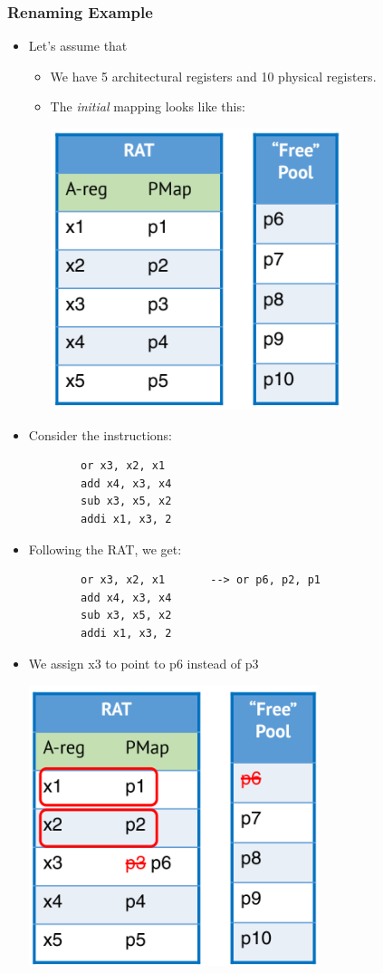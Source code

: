 \documentclass[10pt]{article}
\begin{document}
\subsubsection*{Renaming Example}
\begin{itemize}
    \item Let's assume that
    \begin{itemize}
        \item We have 5 architectural registers and 10 physical registers.
        \item The \textit{initial} mapping looks like this:
        \begin{center}
            \includegraphics[scale=0.9]{W5_3.png}
        \end{center}
    \end{itemize}
    \item Consider the instructions:
    \begin{verbatim}
        or x3, x2, x1
        add x4, x3, x4
        sub x3, x5, x2
        addi x1, x3, 2
    \end{verbatim}
    \item Following the RAT, we get:
    \begin{verbatim}
        or x3, x2, x1       --> or p6, p2, p1
        add x4, x3, x4
        sub x3, x5, x2
        addi x1, x3, 2
    \end{verbatim}
    \item We assign x3 to point to p6 instead of p3
    \begin{center}
        \includegraphics[scale=0.9]{W5_4.png}

\end{center}
\end{itemize}
\end{document}
